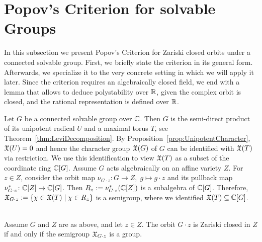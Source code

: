 
\section{Popov's Criterion for solvable Groups} \label{sec:Popov}

In this subsection we present Popov's Criterion for Zariski closed orbits under a connected solvable group. First, we briefly state the criterion in its general form. Afterwards, we specialize it to the very concrete setting in which we will apply it later. Since the criterion requires an algebraically closed field, we end with a lemma that allows to deduce polystability over $\mathbb R$, given the complex orbit is closed, and the rational representation is defined over $\mathbb R$.

Let $G$ be a connected solvable group over $\mathbb C$. Then $G$ is the semi-direct product of its unipotent radical $U$ and a maximal torus $T$, see Theorem~\ref{thm:LeviDecomposition}. By Proposition~\ref{prop:UnipotentCharacter}, $\mathfrak{X}(U) = 0$ and hence the character group $\mathfrak{X}(G)$ of $G$ can be identified with $\mathfrak{X}(T)$ via restriction. We use this identification to view $\mathfrak{X}(T)$ as a subset of the coordinate ring $\mathbb C[G]$. Assume $G$ acts algebraically on an affine variety $Z$. For $z \in Z$, consider the orbit map $\nu_{G \cdot z} \colon G \to Z, \; g \mapsto g \cdot z$ and its pullback map $\nu_{G \cdot z}^\ast \colon \mathbb C[Z] \to \mathbb C[G]$. Then $R_z := \nu_{G \cdot z}^\ast(\mathbb C[Z])$ is a subalgebra of $\mathbb C[G]$. Therefore, $\mathfrak{X}_{G \cdot z} := \{ \chi \in \mathfrak{X}(T) \mid \chi \in R_z \}$ is a semigroup, where we identified $\mathfrak{X}(T) \subseteq \mathbb C[G]$.

\begin{theorem} \label{thm:PopovCriterion}
	\ \\
	Assume $G$ and $Z$ are as above, and let $z \in Z$. The orbit $G \cdot z$ is Zariski closed in $Z$ if and only if the semigroup $\mathfrak{X}_{G \cdot z}$ is a group.
\end{theorem}



